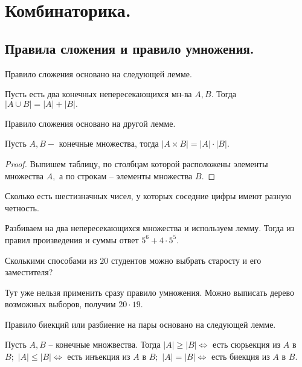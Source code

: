 
\section{Комбинаторика.}

\subsection{Правила сложения и правило умножения.}

Правило сложения основано на следующей лемме.
\begin{lemma}
    Пусть есть два конечных непересекающихся мн-ва $A, B.$ Тогда $|A \cup B| = |A| + |B|.$
\end{lemma}

Правило сложения основано на другой лемме.

\begin{lemma}
    Пусть $A, B - $ конечные множества, тогда $|A \times B| = |A| \cdot |B|.$
\end{lemma}

\begin{proof}
    Выпишем таблицу, по столбцам которой расположены элементы множества $A,$ а по строкам -- элементы множества $B.$
\end{proof}

\begin{example}
    Сколько есть шестизначных чисел, у которых соседние цифры имеют разную четность.
\end{example}

\begin{solution}
    Разбиваем на два непересекающихся множества и используем лемму. Тогда из правил произведения и суммы ответ $5 ^ 6 + 4 \cdot 5^5.$
\end{solution}

\begin{example}
    Сколькими способами из $20$ студентов можно выбрать старосту и его заместителя?
\end{example}

\begin{solution}
    Тут уже нельзя применить сразу правило умножения. Можно выписать дерево возможных выборов, получим $20 \cdot 19.$ 
\end{solution}

Правило биекций или разбиение на пары основано на следующей лемме.

\begin{lemma}
    Пусть $A, B$ -- конечные множвества. Тогда $|A| \geq |B| \Longleftrightarrow$ есть сюрьекция из $A$ в $B;$ $|A| \leq |B| \Longleftrightarrow$ есть инъекция из $A$ в $B;$ $|A| = |B| \Longleftrightarrow$ есть биекция из $A$ в $B.$
\end{lemma}

